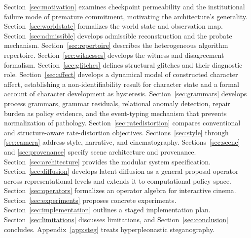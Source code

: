 \documentclass[11pt,a4paper]{article}
\theoremstyle{plain}
\theoremstyle{definition}
\theoremstyle{remark}
\begin{document}
Section~\ref{sec:motivation} examines checkpoint permeability and the institutional failure mode of premature commitment, motivating the architecture's generality. Section~\ref{sec:worldstate} formalizes the world state and observation map. Section~\ref{sec:admissible} develops admissible reconstruction and the probate mechanism. Section~\ref{sec:repertoire} describes the heterogeneous algorithm repertoire. Section~\ref{sec:witnesses} develops the witness and disagreement formalism. Section~\ref{sec:glitches} defines structural glitches and their diagnostic role. Section~\ref{sec:affect} develops a dynamical model of constructed character affect, establishing a non-identifiability result for character state and a formal account of character development as hysteresis. Section~\ref{sec:grammars} develops process grammars, grammar residuals, relational anomaly detection, repair burden as policy evidence, and the event-typing mechanism that prevents normalization of pathology. Section~\ref{sec:ratedistortion} compares conventional and structure-aware rate-distortion objectives. Sections~\ref{sec:style} through \ref{sec:camera} address style, narrative, and cinematography. Sections~\ref{sec:scene} and \ref{sec:provenance} specify scene architecture and provenance. Section~\ref{sec:architecture} provides the modular system specification. Section~\ref{sec:diffusion} develops latent diffusion as a general proposal operator across representational levels and extends it to computational policy space. Section~\ref{sec:operators} formalizes an operator algebra for interactive cinema. Section~\ref{sec:experiments} proposes concrete experiments. Section~\ref{sec:implementation} outlines a staged implementation plan. Section~\ref{sec:limitations} discusses limitations, and Section~\ref{sec:conclusion} concludes. Appendix~\ref{app:steg} treats hyperpleonastic steganography.
\end{document}
